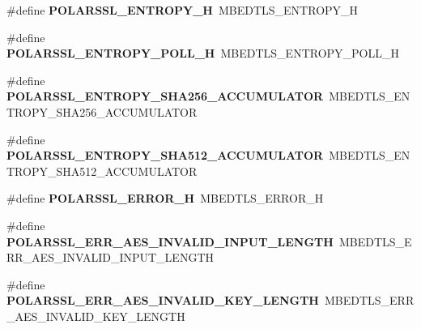 \begin{DoxyCompactItemize}
\#define {\bfseries P\+O\+L\+A\+R\+S\+S\+L\+\_\+\+E\+N\+T\+R\+O\+P\+Y\+\_\+H}~M\+B\+E\+D\+T\+L\+S\+\_\+\+E\+N\+T\+R\+O\+P\+Y\+\_\+H
\item 
\mbox{\label{compat-1_83_8h_a5a6b61d667fca6fc9982bf1a0ae01a47}} 
\#define {\bfseries P\+O\+L\+A\+R\+S\+S\+L\+\_\+\+E\+N\+T\+R\+O\+P\+Y\+\_\+\+P\+O\+L\+L\+\_\+H}~M\+B\+E\+D\+T\+L\+S\+\_\+\+E\+N\+T\+R\+O\+P\+Y\+\_\+\+P\+O\+L\+L\+\_\+H
\item 
\mbox{\label{compat-1_83_8h_aae901da2a3341767b2dc61f7e21876a1}} 
\#define {\bfseries P\+O\+L\+A\+R\+S\+S\+L\+\_\+\+E\+N\+T\+R\+O\+P\+Y\+\_\+\+S\+H\+A256\+\_\+\+A\+C\+C\+U\+M\+U\+L\+A\+T\+OR}~M\+B\+E\+D\+T\+L\+S\+\_\+\+E\+N\+T\+R\+O\+P\+Y\+\_\+\+S\+H\+A256\+\_\+\+A\+C\+C\+U\+M\+U\+L\+A\+T\+OR
\item 
\mbox{\label{compat-1_83_8h_a9d15b029b1caee03c5c2b77b81c1147f}} 
\#define {\bfseries P\+O\+L\+A\+R\+S\+S\+L\+\_\+\+E\+N\+T\+R\+O\+P\+Y\+\_\+\+S\+H\+A512\+\_\+\+A\+C\+C\+U\+M\+U\+L\+A\+T\+OR}~M\+B\+E\+D\+T\+L\+S\+\_\+\+E\+N\+T\+R\+O\+P\+Y\+\_\+\+S\+H\+A512\+\_\+\+A\+C\+C\+U\+M\+U\+L\+A\+T\+OR
\item 
\mbox{\label{compat-1_83_8h_a060182b7cc71812f7676f2841ee183ff}} 
\#define {\bfseries P\+O\+L\+A\+R\+S\+S\+L\+\_\+\+E\+R\+R\+O\+R\+\_\+H}~M\+B\+E\+D\+T\+L\+S\+\_\+\+E\+R\+R\+O\+R\+\_\+H
\item 
\mbox{\label{compat-1_83_8h_a3a36fba5d9dcc0a3c8cf190933c7af14}} 
\#define {\bfseries P\+O\+L\+A\+R\+S\+S\+L\+\_\+\+E\+R\+R\+\_\+\+A\+E\+S\+\_\+\+I\+N\+V\+A\+L\+I\+D\+\_\+\+I\+N\+P\+U\+T\+\_\+\+L\+E\+N\+G\+TH}~M\+B\+E\+D\+T\+L\+S\+\_\+\+E\+R\+R\+\_\+\+A\+E\+S\+\_\+\+I\+N\+V\+A\+L\+I\+D\+\_\+\+I\+N\+P\+U\+T\+\_\+\+L\+E\+N\+G\+TH
\item 
\mbox{\label{compat-1_83_8h_ac9743adb9edbf81a73b5d522902163e4}} 
\#define {\bfseries P\+O\+L\+A\+R\+S\+S\+L\+\_\+\+E\+R\+R\+\_\+\+A\+E\+S\+\_\+\+I\+N\+V\+A\+L\+I\+D\+\_\+\+K\+E\+Y\+\_\+\+L\+E\+N\+G\+TH}~M\+B\+E\+D\+T\+L\+S\+\_\+\+E\+R\+R\+\_\+\+A\+E\+S\+\_\+\+I\+N\+V\+A\+L\+I\+D\+\_\+\+K\+E\+Y\+\_\+\+L\+E\+N\+G\+TH
\item 
\mbox{\label{compat-1_83_8h_afc87dd8ff36b6f9354941b0de4567cc6}} 

\end{DoxyCompactItemize}
